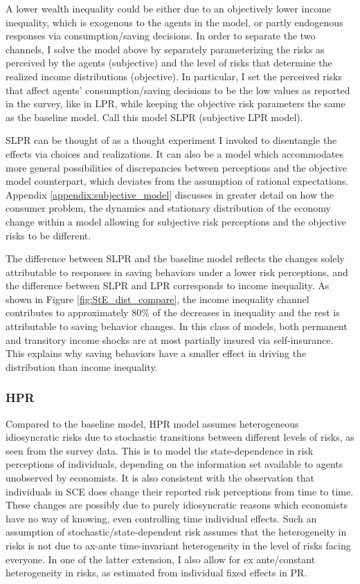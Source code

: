 A lower wealth inequality could be either due to an objectively lower income inequality, which is exogenous to the agents in the model, or partly endogenous responses via consumption/saving decisions. In order to separate the two channels, I solve the model above by separately parameterizing the risks as perceived by the agents (subjective) and the level of risks that determine the realized income distributions (objective). In particular, I set the perceived risks that affect agents' consumption/saving decisions to be the low values as reported in the survey, like in LPR, while keeping the objective risk parameters the same as the baseline model. Call this model SLPR (subjective LPR model). %

SLPR can be thought of as a thought experiment I invoked to disentangle the effects via choices and realizations. It can also be a model which accommodates more general possibilities of discrepancies between perceptions and the objective model counterpart,  which deviates from the assumption of rational expectations. Appendix \ref{appendix:subjective_model} discusses in greater detail on how the consumer problem, the dynamics and stationary distribution of the economy change within a model allowing for subjective risk perceptions and the objective risks to be different. 


The difference between SLPR and the baseline model reflects the changes solely attributable to responses in saving behaviors under a lower risk perceptions, and the difference between SLPR and LPR corresponds to income inequality. As shown in Figure \ref{fig:StE_dist_compare}, the income inequality channel contributes to approximately 80\% of the decreases in inequality and the rest is attributable to saving behavior changes. In this class of models, both permanent and transitory income shocks are at most partially insured via self-insurance. This explains why saving behaviors have a smaller effect in driving the distribution than income inequality. 


\subsubsection{HPR}

Compared to the baseline model, HPR model assumes heterogeneous idiosyncratic risks due to stochastic transitions between different levels of risks, as seen from the survey data. This is to model the state-dependence in risk perceptions of individuals, depending on the information set available to agents unobserved by economists. It is also consistent with the observation that individuals in SCE does change their reported risk perceptions from time to time. These changes are possibly due to purely idiosyncratic reasons which economists have no way of knowing, even controlling time individual effects. Such an assumption of stochastic/state-dependent risk assumes that the heterogeneity in risks is not due to ax-ante time-invariant heterogeneity in the level of risks facing everyone. In one of the latter extension, I also allow for ex ante/constant heterogeneity in risks, as estimated from individual fixed effects in PR.  

